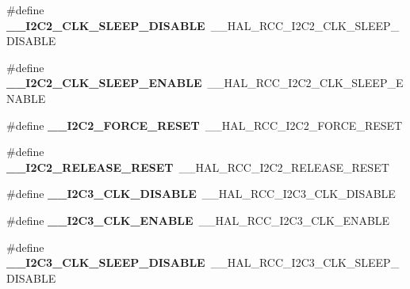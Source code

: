 \begin{DoxyCompactItemize}
\item 
\mbox{\label{group___h_a_l___r_c_c___aliased_ga9433bf9082b7128475bf4a4073bcdca1}} 
\#define {\bfseries \+\_\+\+\_\+\+I2\+C2\+\_\+\+C\+L\+K\+\_\+\+S\+L\+E\+E\+P\+\_\+\+D\+I\+S\+A\+B\+LE}~\+\_\+\+\_\+\+H\+A\+L\+\_\+\+R\+C\+C\+\_\+\+I2\+C2\+\_\+\+C\+L\+K\+\_\+\+S\+L\+E\+E\+P\+\_\+\+D\+I\+S\+A\+B\+LE
\item 
\mbox{\label{group___h_a_l___r_c_c___aliased_ga64ad1beac30d497e381d374778b1a953}} 
\#define {\bfseries \+\_\+\+\_\+\+I2\+C2\+\_\+\+C\+L\+K\+\_\+\+S\+L\+E\+E\+P\+\_\+\+E\+N\+A\+B\+LE}~\+\_\+\+\_\+\+H\+A\+L\+\_\+\+R\+C\+C\+\_\+\+I2\+C2\+\_\+\+C\+L\+K\+\_\+\+S\+L\+E\+E\+P\+\_\+\+E\+N\+A\+B\+LE
\item 
\mbox{\label{group___h_a_l___r_c_c___aliased_ga07143f105327507321078f673940461d}} 
\#define {\bfseries \+\_\+\+\_\+\+I2\+C2\+\_\+\+F\+O\+R\+C\+E\+\_\+\+R\+E\+S\+ET}~\+\_\+\+\_\+\+H\+A\+L\+\_\+\+R\+C\+C\+\_\+\+I2\+C2\+\_\+\+F\+O\+R\+C\+E\+\_\+\+R\+E\+S\+ET
\item 
\mbox{\label{group___h_a_l___r_c_c___aliased_gaf7a482f23ba23252ef88c00e86edde9a}} 
\#define {\bfseries \+\_\+\+\_\+\+I2\+C2\+\_\+\+R\+E\+L\+E\+A\+S\+E\+\_\+\+R\+E\+S\+ET}~\+\_\+\+\_\+\+H\+A\+L\+\_\+\+R\+C\+C\+\_\+\+I2\+C2\+\_\+\+R\+E\+L\+E\+A\+S\+E\+\_\+\+R\+E\+S\+ET
\item 
\mbox{\label{group___h_a_l___r_c_c___aliased_ga7da00da30c1b02d1c1299dd878214db2}} 
\#define {\bfseries \+\_\+\+\_\+\+I2\+C3\+\_\+\+C\+L\+K\+\_\+\+D\+I\+S\+A\+B\+LE}~\+\_\+\+\_\+\+H\+A\+L\+\_\+\+R\+C\+C\+\_\+\+I2\+C3\+\_\+\+C\+L\+K\+\_\+\+D\+I\+S\+A\+B\+LE
\item 
\mbox{\label{group___h_a_l___r_c_c___aliased_gaf7f71023839a5cad83bada95ff73741f}} 
\#define {\bfseries \+\_\+\+\_\+\+I2\+C3\+\_\+\+C\+L\+K\+\_\+\+E\+N\+A\+B\+LE}~\+\_\+\+\_\+\+H\+A\+L\+\_\+\+R\+C\+C\+\_\+\+I2\+C3\+\_\+\+C\+L\+K\+\_\+\+E\+N\+A\+B\+LE
\item 
\mbox{\label{group___h_a_l___r_c_c___aliased_ga35accdf6700c08b879d2540130cf19aa}} 
\#define {\bfseries \+\_\+\+\_\+\+I2\+C3\+\_\+\+C\+L\+K\+\_\+\+S\+L\+E\+E\+P\+\_\+\+D\+I\+S\+A\+B\+LE}~\+\_\+\+\_\+\+H\+A\+L\+\_\+\+R\+C\+C\+\_\+\+I2\+C3\+\_\+\+C\+L\+K\+\_\+\+S\+L\+E\+E\+P\+\_\+\+D\+I\+S\+A\+B\+LE

\end{DoxyCompactItemize}
